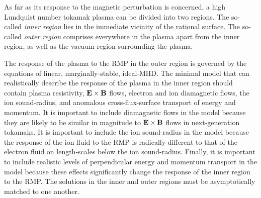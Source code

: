 \documentclass[12pt,prb,aps]{revtex4-1}
\begin{document}
As far as its response to the magnetic perturbation is concerned, a high Lundquist number
tokamak plasma can be divided into two regions.\cite{fkr,hk,wb,err1,err1a,rf1,rf2,err2,com,hz,err3}
 The so-called {\em inner region}\/ lies in the immediate
vicinity of the rational surface. The so-called {\em outer region}\/ comprises everywhere in the plasma apart from the
inner region, as well as the vacuum region surrounding the plasma. 

The response of the plasma to the RMP in the outer region is
governed by the equations of linear, marginally-stable, ideal-MHD.\cite{err1} The minimal model that can
realistically describe the response of the plasma in the inner region  should contain plasma resistivity, ${\bf E}\times {\bf B}$ flows, electron and ion diamagnetic flows, the ion sound-radius, and anomalous cross-flux-surface transport of energy and momentum. It is important to include diamagnetic flows in the model because they are likely to be similar in magnitude to ${\bf E}\times {\bf B}$ flows in next-generation tokamaks.  It is important to include the ion sound-radius in the model because the
response of the ion fluid to the RMP is radically different to that of the electron fluid on length-scales
below the ion sound-radius. Finally, it is important to include realistic levels of perpendicular energy and momentum
transport in the model because these effects significantly  change the response of the inner region to 
the RMP.\cite{err2} The solutions in the inner and outer regions must be asymptotically 
matched to one another.\cite{fkr}
\end{document}
